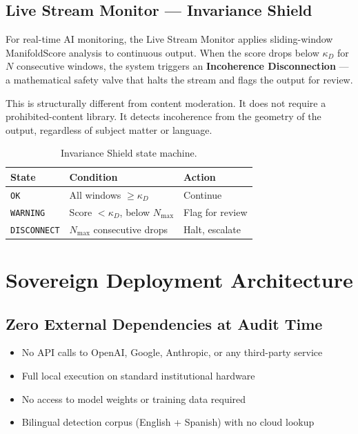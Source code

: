 \documentclass[11pt, a4paper]{article}
\begin{document}
\subsection{Live Stream Monitor --- Invariance Shield}

For real-time AI monitoring, the Live Stream Monitor applies sliding-window
ManifoldScore analysis to continuous output. When the score drops below
$\kappa_D$ for $N$ consecutive windows, the system triggers an
\textbf{Incoherence Disconnection} --- a mathematical safety valve that halts
the stream and flags the output for review.

This is structurally different from content moderation. It does not require
a prohibited-content library. It detects incoherence from the geometry of
the output, regardless of subject matter or language.

\begin{table}[H]
\centering
\caption{Invariance Shield state machine.}
\begin{tabular}{lll}
\toprule
\textbf{State} & \textbf{Condition} & \textbf{Action} \\
\midrule
\texttt{OK} & All windows $\geq \kappa_D$ & Continue \\
\texttt{WARNING} & Score $< \kappa_D$, below $N_{\max}$ & Flag for review \\
\texttt{DISCONNECT} & $N_{\max}$ consecutive drops & Halt, escalate \\
\bottomrule
\end{tabular}
\end{table}

\section{Sovereign Deployment Architecture}

\subsection{Zero External Dependencies at Audit Time}

\begin{itemize}[leftmargin=*]
  \item No API calls to OpenAI, Google, Anthropic, or any third-party service
  \item Full local execution on standard institutional hardware
  \item No access to model weights or training data required
  \item Bilingual detection corpus (English + Spanish) with no cloud lookup
\end{itemize}
\end{document}

